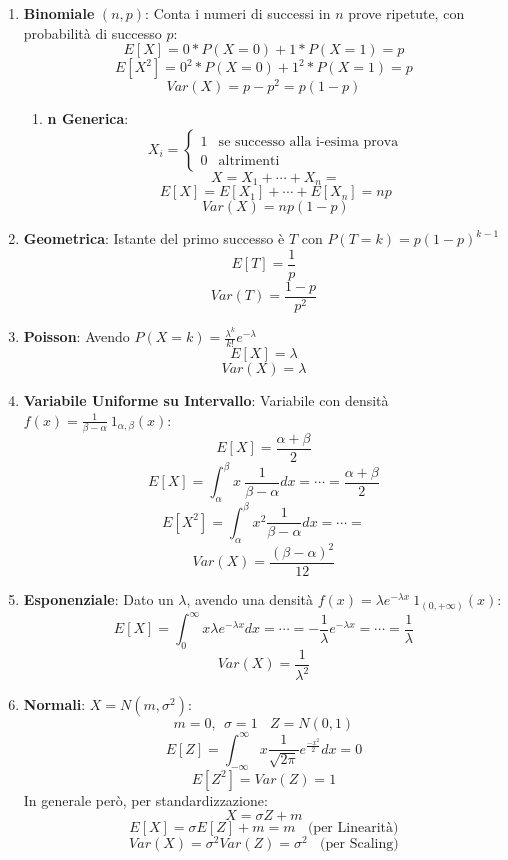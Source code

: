 \documentclass{article}
\begin{document}
\begin{enumerate}
    \item \textbf{Binomiale} $(n,p)$: Conta i numeri di successi in $n$ prove ripetute, con probabilità di successo $p$:
    \[ E[X] = 0 * P(X = 0) + 1 * P(X=1) = p \]
    \[ E[X^{2}] = 0^{2} * P(X = 0) + 1^{2} * P(X=1) = p \]
    \[ Var(X) = p - p^{2} = p(1-p) \]
    \begin{enumerate}
        \item \textbf{n Generica}:
        \[ X_{i} =  \left\{ \begin{array}{rcl}
        1 & \mbox{se successo alla i-esima prova}  \\
        0 & \mbox{altrimenti} 
        \end{array}\right. \]
        \[ X = X_{1} + \cdots + X_{n} =  \]
        \[ E[X] = E[X_{1}] + \cdots + E[X_{n}] = np \]
        \[ Var(X) = np(1-p) \]

    \end{enumerate}
    \item \textbf{Geometrica}: Istante del primo successo è $T$ con $P(T=k) = p(1-p)^{k-1} $
    \[ E[T] = \frac{1}{p} \]
    \[ Var(T) = \frac{1-p}{p^{2}} \]
    \item \textbf{Poisson}: Avendo $P(X=k)=\frac{\lambda^{k}}{k!}e^{-\lambda}$
    \[ E[X] = \lambda \]
    \[ Var(X) = \lambda \]
    \item \textbf{Variabile Uniforme su Intervallo}: Variabile con densità $f(x) = \frac{1}{\beta - \alpha}\:1_{\alpha,\beta}(x)$:
    \[ E[X] = \frac{\alpha + \beta}{2} \]
    \[ E[X] = \int_{\alpha}^{\beta} x \: \frac{1}{\beta - \alpha} dx = \cdots = \frac{\alpha + \beta}{2} \]
    \[ E[X^{2}] = \int_{\alpha}^{\beta} x^{2} \frac{1}{\beta - \alpha} dx = \cdots =  \]
    \[ Var(X) = \frac{(\beta - \alpha)^{2}}{12} \]
    \item \textbf{Esponenziale}: Dato un $\lambda$, avendo una densità $f(x) = \lambda e^{-\lambda x}\:1_{(0,+\infty)}(x)$:
    \[ E[X] = \int_{0}^{\infty} x \lambda e^{-\lambda x} dx = \cdots = -\frac{1}{\lambda}e^{-\lambda x} = \cdots = \frac{1}{\lambda} \]
    \[ Var(X) = \frac{1}{\lambda^{2}} \]
\newpage
    \item \textbf{Normali}: $X = N(m, \sigma^{2})$:
    \[ m = 0, \: \: \sigma = 1 \:\:\:\: Z = N(0,1) \]
    \[ E[Z] = \int_{-\infty}^{\infty} x \frac{1}{\sqrt{2\pi}}e^{\frac{-x^{2}}{2}} dx = 0\]
    \[ E[Z^{2}] = Var(Z) = 1 \]
    In generale però, per standardizzazione:
    \[ X = \sigma Z + m \]
    \[ E[X] = \sigma E[Z] + m = m \:\:\:\: \text{(per Linearità)} \]
    \[ Var(X) = \sigma^{2} Var(Z) = \sigma^{2} \:\:\:\: \text{(per Scaling)}\]

\end{enumerate}
\end{document}
